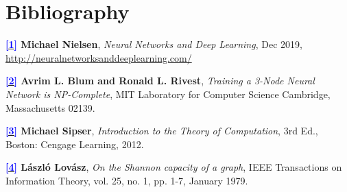\documentclass[../main]{subfiles}
\begin{document}
\chapter{Bibliography}

{
\hypersetup{linkcolor=black}
\minitoc
}

\hypertarget{target:zona}{}


{\bfseries \hyperlink{target:zona}{\textcolor{blue}{[1]}} Michael Nielsen}, \emph{Neural Networks and Deep Learning}, Dec 2019, \\
\hspace{2em} \url{http://neuralnetworksanddeeplearning.com/}

{\bfseries \hyperlink{target:zona}{\textcolor{blue}{[2]}} Avrim L. Blum and Ronald L. Rivest}, \emph{Training a 3-Node Neural Network is 
NP-Complete}, MIT Laboratory for Computer Science Cambridge, Massachusetts 02139.

{\bfseries \hyperlink{target:zona}{\textcolor{blue}{[3]}} Michael Sipser}, \emph{Introduction to the Theory of Computation}, 3rd Ed., Boston: Cengage Learning, 2012.

{\bfseries \hyperlink{target:zona}{\textcolor{blue}{[4]}} László Lovász}, \emph{On the Shannon capacity of a graph}, IEEE Transactions on Information Theory, vol. 25, no. 1, pp. 1-7, January 1979.
\end{document}
